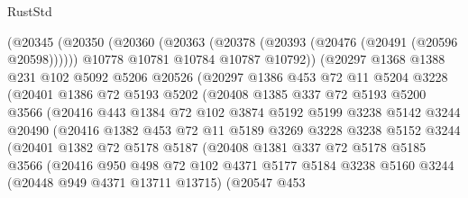 \begin{lexlean}{RustStd}
\begin{coremodule}
            (@20345
              (@20350
                (@20360
                  (@20363 (@20378 (@20393 (@20476 (@20491 (@20596 @20598))))))
                  @10778
                  @10781
                  @10784
                  @10787
                  @10792))
              (@20297
                @1368
                @1388
                @231
                @102
                @5092
                @5206
                @20526
                (@20297
                  @1386
                  @453
                  @72
                  @11
                  @5204
                  @3228
                  (@20401
                    @1386
                    @72
                    @5193
                    @5202
                    (@20408
                      @1385
                      @337
                      @72
                      @5193
                      @5200
                      @3566
                      (@20416
                        @443
                        @1384
                        @72
                        @102
                        @3874
                        @5192
                        @5199
                        @3238
                        @5142
                        @3244
                        @20490
                        (@20416
                          @1382
                          @453
                          @72
                          @11
                          @5189
                          @3269
                          @3228
                          @3238
                          @5152
                          @3244
                          (@20401
                            @1382
                            @72
                            @5178
                            @5187
                            (@20408
                              @1381
                              @337
                              @72
                              @5178
                              @5185
                              @3566
                              (@20416
                                @950
                                @498
                                @72
                                @102
                                @4371
                                @5177
                                @5184
                                @3238
                                @5160
                                @3244
                                (@20448 @949 @4371 @13711 @13715)
                                (@20547
                                  @453

\end{coremodule}
\end{lexlean}
